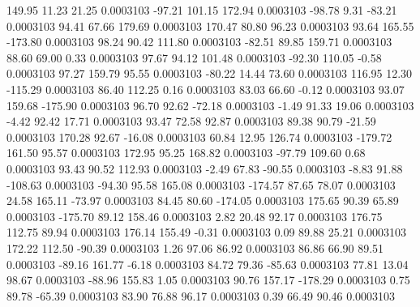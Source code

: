       149.95       11.23       21.25     0.0003103
      -97.21      101.15      172.94     0.0003103
      -98.78        9.31      -83.21     0.0003103
       94.41       67.66      179.69     0.0003103
      170.47       80.80       96.23     0.0003103
       93.64      165.55     -173.80     0.0003103
       98.24       90.42      111.80     0.0003103
      -82.51       89.85      159.71     0.0003103
       88.60       69.00        0.33     0.0003103
       97.67       94.12      101.48     0.0003103
      -92.30      110.05       -0.58     0.0003103
       97.27      159.79       95.55     0.0003103
      -80.22       14.44       73.60     0.0003103
      116.95       12.30     -115.29     0.0003103
       86.40      112.25        0.16     0.0003103
       83.03       66.60       -0.12     0.0003103
       93.07      159.68     -175.90     0.0003103
       96.70       92.62      -72.18     0.0003103
       -1.49       91.33       19.06     0.0003103
       -4.42       92.42       17.71     0.0003103
       93.47       72.58       92.87     0.0003103
       89.38       90.79      -21.59     0.0003103
      170.28       92.67      -16.08     0.0003103
       60.84       12.95      126.74     0.0003103
     -179.72      161.50       95.57     0.0003103
      172.95       95.25      168.82     0.0003103
      -97.79      109.60        0.68     0.0003103
       93.43       90.52      112.93     0.0003103
       -2.49       67.83      -90.55     0.0003103
       -8.83       91.88     -108.63     0.0003103
      -94.30       95.58      165.08     0.0003103
     -174.57       87.65       78.07     0.0003103
       24.58      165.11      -73.97     0.0003103
       84.45       80.60     -174.05     0.0003103
      175.65       90.39       65.89     0.0003103
     -175.70       89.12      158.46     0.0003103
        2.82       20.48       92.17     0.0003103
      176.75      112.75       89.94     0.0003103
      176.14      155.49       -0.31     0.0003103
        0.09       89.88       25.21     0.0003103
      172.22      112.50      -90.39     0.0003103
        1.26       97.06       86.92     0.0003103
       86.86       66.90       89.51     0.0003103
      -89.16      161.77       -6.18     0.0003103
       84.72       79.36      -85.63     0.0003103
       77.81       13.04       98.67     0.0003103
      -88.96      155.83        1.05     0.0003103
       90.76      157.17     -178.29     0.0003103
        0.75       89.78      -65.39     0.0003103
       83.90       76.88       96.17     0.0003103
        0.39       66.49       90.46     0.0003103
